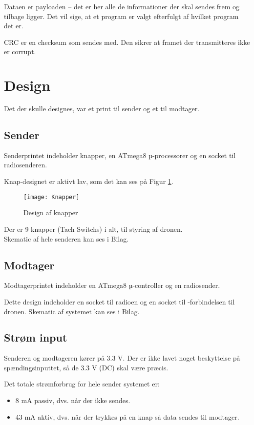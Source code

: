 \documentclass[Main]{subfiles}
\begin{document}
Dataen er payloaden -- det er her alle de informationer der skal sendes frem og tilbage ligger. 
Det vil sige, at et program er valgt efterfulgt af hvilket program det er.

CRC er en checksum som sendes med. 
Den sikrer at framet der transmitteres ikke er corrupt.



\section{Design}
Det der skulle designes, var et print til sender og et til modtager.

\subsection{Sender}
Senderprintet indeholder knapper, en ATmega8 µ-processorer og en socket til radiosenderen.

Knap-designet er aktivt lav, som det kan ses på Figur \ref{fig: Knapper}.


\begin{figure}[H]
\centering
\texttt{[image: Knapper]}
\caption{Design af knapper}
\label{fig: Knapper}
\end{figure}

Der er 9 knapper (Tach Switchs) i alt, til styring af dronen.\\
Skematic af hele senderen kan ses i Bilag\cite{SenderSCM}.


\subsection{Modtager}

Modtagerprintet indeholder en ATmega8 µ-controller og en radiosender.

Dette design indeholder en socket til radioen og en socket til \itoc-forbindelsen til dronen.
Skematic af systemet kan ses i Bilag\cite{ModtagerSCM}.


\subsection{Strøm input}

Senderen og modtageren kører på 3.3 V.
Der er ikke lavet noget beskyttelse på spændingsinputtet, så de 3.3 V (DC) skal være præcis.

Det totale strømforbrug for hele sender systemet er:
\vspace{-20pt}
\begin{itemize}
\item 8 mA passiv, dvs. når der ikke sendes.
\item 43 mA aktiv, dvs. når der trykkes på en knap så data sendes til modtager.
\end{itemize}
\end{document}
